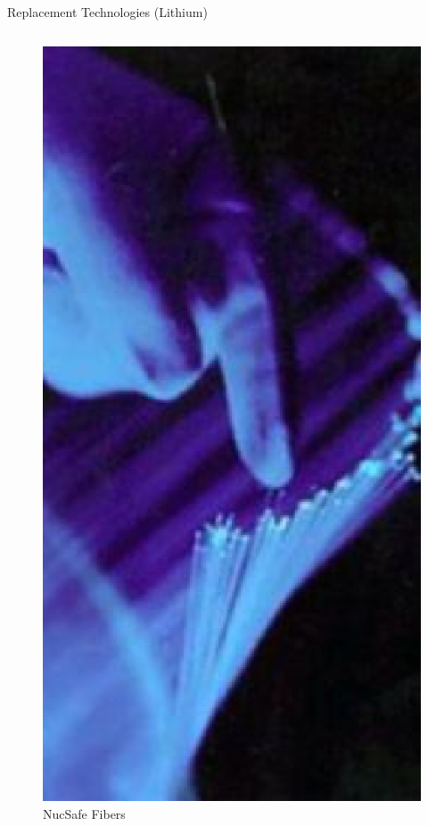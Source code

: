 \documentclass{beamer}
\begin{document}
\begin{frame}{Replacement Technologies (Lithium)}
\begin{columns}[onlytextwidth]
\begin{column}{0.45\textwidth}
\begin{figure}
		\includegraphics[height=0.25\textheight]{images/NucSafeFibers.eps}
		\caption{NucSafe Fibers}
		\label{fig:NucSafeFibers}
	\end{figure}
\end{column}
\end{columns}
\end{frame}
\end{document}
